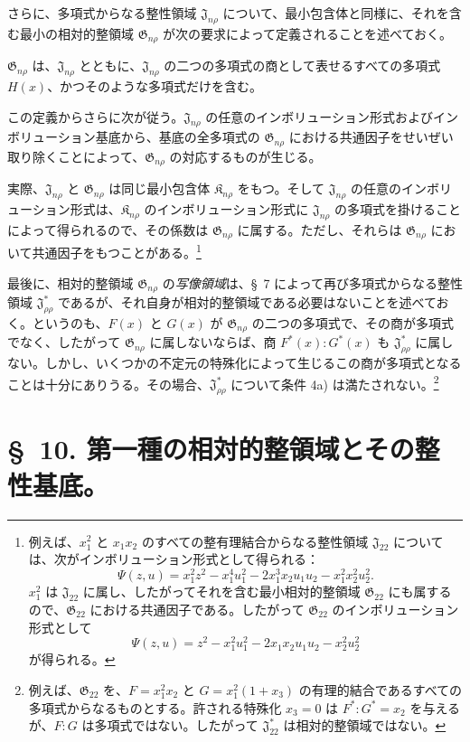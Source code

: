 \documentclass[11pt]{jlreq}
\providecommand{\Kfield}{\mathfrak{K}}
\providecommand{\Jdom}{\mathfrak{J}}
\providecommand{\Gdom}{\mathfrak{G}}
\begin{document}
さらに、多項式からなる整性領域 $\Jdom_{n\rho}$ について、最小包含体と同様に、それを含む最小の相対的整領域 $\Gdom_{n\rho}$ が次の要求によって定義されることを述べておく。

$\Gdom_{n\rho}$ は、$\Jdom_{n\rho}$ とともに、$\Jdom_{n\rho}$ の二つの多項式の商として表せるすべての多項式 $H(x)$、かつそのような多項式だけを含む。

この定義からさらに次が従う。$\Jdom_{n\rho}$ の任意のインボリューション形式およびインボリューション基底から、基底の全多項式の $\Gdom_{n\rho}$ における共通因子をせいぜい取り除くことによって、$\Gdom_{n\rho}$ の対応するものが生じる。

実際、$\Jdom_{n\rho}$ と $\Gdom_{n\rho}$ は同じ最小包含体 $\Kfield_{n\rho}$ をもつ。そして $\Jdom_{n\rho}$ の任意のインボリューション形式は、$\Kfield_{n\rho}$ のインボリューション形式に $\Jdom_{n\rho}$ の多項式を掛けることによって得られるので、その係数は $\Gdom_{n\rho}$ に属する。ただし、それらは $\Gdom_{n\rho}$ において共通因子をもつことがある。\footnote{例えば、$x_1^2$ と $x_1x_2$ のすべての整有理結合からなる整性領域 $\Jdom_{22}$ については、次がインボリューション形式として得られる：
\[
\Psi(z,u)=x_1^2z^2-x_1^4u_1^2-2x_1^3x_2u_1u_2-x_1^2x_2^2u_2^2.
\]
$x_1^2$ は $\Jdom_{22}$ に属し、したがってそれを含む最小相対的整領域 $\Gdom_{22}$ にも属するので、$\Gdom_{22}$ における共通因子である。したがって $\Gdom_{22}$ のインボリューション形式として
\[
\Psi(z,u)=z^2-x_1^2u_1^2-2x_1x_2u_1u_2-x_2^2u_2^2
\]
が得られる。}

最後に、相対的整領域 $\Gdom_{n\rho}$ の\emph{写像領域}は、\S\ 7 によって再び多項式からなる整性領域 $\Jdom^*_{\rho\rho}$ であるが、それ自身が相対的整領域である必要はないことを述べておく。というのも、$F(x)$ と $G(x)$ が $\Gdom_{n\rho}$ の二つの多項式で、その商が多項式でなく、したがって $\Gdom_{n\rho}$ に属しないならば、商 $F^*(x):G^*(x)$ も $\Jdom^*_{\rho\rho}$ に属しない。しかし、いくつかの不定元の特殊化によって生じるこの商が多項式となることは十分にありうる。その場合、$\Jdom^*_{\rho\rho}$ について条件 4a) は満たされない。\footnote{例えば、$\Gdom_{22}$ を、$F=x_1^2x_2$ と $G=x_1^2(1+x_3)$ の有理的結合であるすべての多項式からなるものとする。許される特殊化 $x_3=0$ は $F^*:G^*=x_2$ を与えるが、$F:G$ は多項式ではない。したがって $\Jdom^*_{22}$ は相対的整領域ではない。}

\section*{\S\ 10. 第一種の相対的整領域とその整性基底。}
\end{document}
